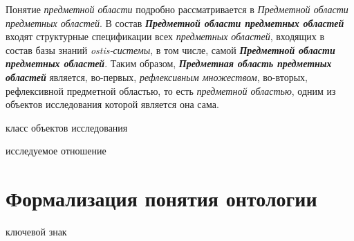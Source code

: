 Понятие \textit{предметной области} подробно рассматривается в \textit{Предметной области предметных областей}. В состав \textbf{\textit{Предметной области предметных областей}} входят структурные спецификации всех \textit{предметных областей}, входящих в состав базы знаний \textit{ostis-системы}, в том числе, самой \textbf{\textit{Предметной области предметных областей}}. Таким образом, \textbf{\textit{Предметная область предметных областей}} является, во-первых, \textit{рефлексивным множеством}, во-вторых, рефлексивной предметной областью, то есть \textit{предметной областью}, одним из объектов исследования которой является она сама.

\begin{SCn}
	\begin{scnhaselementrolelist}{класс объектов исследования}
	\end{scnhaselementrolelist}
	\begin{scnhaselementrolelist}{исследуемое отношение}
	\end{scnhaselementrolelist}
\end{SCn}

\section{Формализация понятия онтологии}
\label{sec_ontology}

\begin{SCn}
	\begin{scnrelfromlist}{ключевой знак}
	\end{scnrelfromlist}
\end{SCn}

